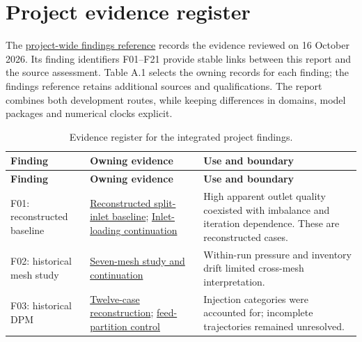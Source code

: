 \section{Project evidence register}

The \href{../project-findings-and-report-claims.md}{project-wide findings reference} records the evidence reviewed on 16 October 2026. Its finding identifiers F01--F21 provide stable links between this report and the source assessment. Table A.1 selects the owning records for each finding; the findings reference retains additional sources and qualifications. The report combines both development routes, while keeping differences in domains, model packages and numerical clocks explicit.

\begin{longtable}{@{}>{\raggedright\arraybackslash}p{0.29000000\dimexpr\linewidth-4\tabcolsep\relax}>{\raggedright\arraybackslash}p{0.34000000\dimexpr\linewidth-4\tabcolsep\relax}>{\raggedright\arraybackslash}p{0.37000000\dimexpr\linewidth-4\tabcolsep\relax}@{}}
\caption{Evidence register for the integrated project findings.}\label{tab:table-A.1}\\
\toprule
\textbf{Finding} & \textbf{Owning evidence} & \textbf{Use and boundary} \\
\midrule
\endfirsthead
\toprule
\textbf{Finding} & \textbf{Owning evidence} & \textbf{Use and boundary} \\
\midrule
\endhead
F01: reconstructed baseline & \href{../../../../experiments/phase-02-parity-reset-and-pre-v2-qualification/purnanto-08b-parity-split-inlet/results.md}{Reconstructed split-inlet baseline}; \href{../../../../experiments/phase-02-parity-reset-and-pre-v2-qualification/purnanto-08c-inlet-loading-sensitivity/results.md}{Inlet-loading continuation} & High apparent outlet quality coexisted with imbalance and iteration dependence. These are reconstructed cases. \\
F02: historical mesh study & \href{../../../../experiments/phase-02-parity-reset-and-pre-v2-qualification/purnanto-08b-parity-split-inlet/mesh-convergence-checkpoint-20260803.md}{Seven-mesh study and continuation} & Within-run pressure and inventory drift limited cross-mesh interpretation. \\
F03: historical DPM & \href{../../../../experiments/phase-03-dpm-carryover-and-coupling/historical-andy-studies/enthalpy-dpm-replication.md}{Twelve-case reconstruction}; \href{../../../../experiments/phase-03-dpm-carryover-and-coupling/purnanto-09cV2-dpm-partition-control/results.md}{feed-partition control} & Injection categories were accounted for; incomplete trajectories remained unresolved. \\

\end{longtable}
